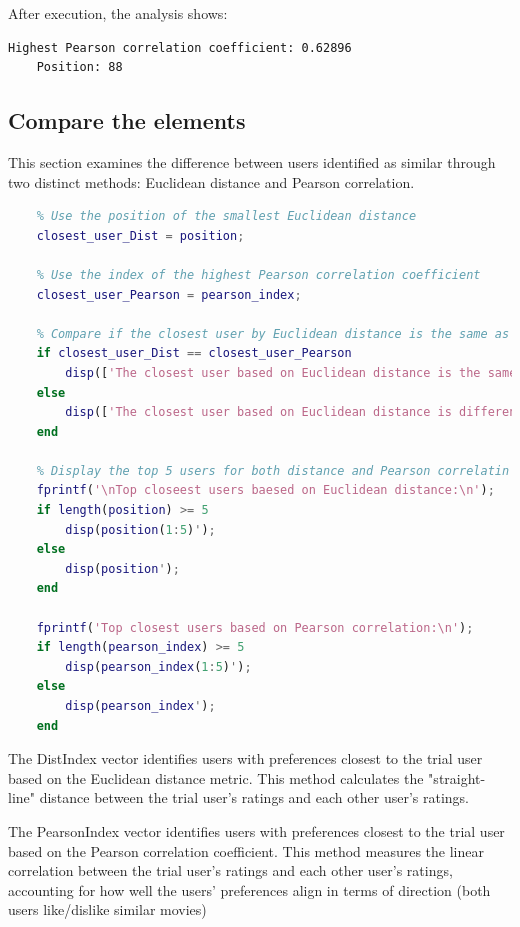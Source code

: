 After execution, the analysis shows:

\begin{lstlisting}[style=StyleResult]
	Highest Pearson correlation coefficient: 0.62896
	Position: 88
\end{lstlisting}

\subsection{Compare the elements}

This section examines the difference between users identified as similar through two distinct methods: Euclidean distance and Pearson correlation.

\begin{lstlisting}[style=StyleCode, language=MATLAB]
	% Compare the elements of the vectors DistIndex, PearsonIndex
	% Use the position of the smallest Euclidean distance
	closest_user_Dist = position;
	
	% Use the index of the highest Pearson correlation coefficient
	closest_user_Pearson = pearson_index;
	
	% Compare if the closest user by Euclidean distance is the same as the closest user by Pearson correlation
	if closest_user_Dist == closest_user_Pearson
		disp(['The closest user based on Euclidean distance is the same as the closest user based on Pearson correlation.']);
	else
		disp(['The closest user based on Euclidean distance is different from the closest user baesd on Pearson correlation.']);
	end
	
	% Display the top 5 users for both distance and Pearson correlatin for comparison
	fprintf('\nTop closeest users baesed on Euclidean distance:\n');
	if length(position) >= 5
		disp(position(1:5)');
	else 
		disp(position');
	end
	
	fprintf('Top closest users based on Pearson correlation:\n');
	if length(pearson_index) >= 5
		disp(pearson_index(1:5)');
	else
		disp(pearson_index');
	end
\end{lstlisting}

The DistIndex vector identifies users with preferences closest to the trial user based on the Euclidean distance metric. This method calculates the "straight-line" distance between the trial user’s ratings and each other user’s ratings.

The PearsonIndex vector identifies users with preferences closest to the trial user based on the Pearson correlation coefficient. This method measures the linear correlation between the trial user’s ratings and each other user’s ratings, accounting for how well the users' preferences align in terms of direction (both users like/dislike similar movies)

